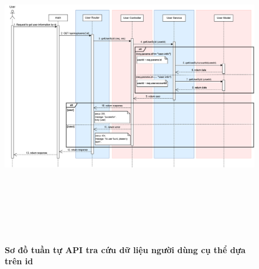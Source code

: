 \begin{figure}[H]
	\centering
	\includegraphics[width=16cm,height=14cm]{Images/api_sequence/user/getUserById.drawio.png}
	\caption[Sơ đồ tuần tự API tra cứu dữ liệu người dùng cụ thể dựa trên id]{\bfseries \fontsize{12pt}{0pt}\selectfont Sơ đồ tuần tự API tra cứu dữ liệu người dùng cụ thể dựa trên id}
	\label{sequence_diagram_get_user_by_id}
\end{figure}

